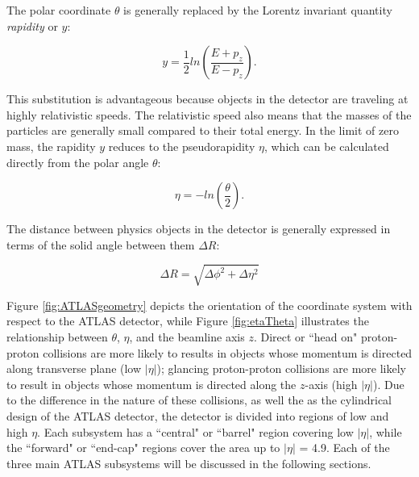 \indent The polar coordinate $\theta$ is generally replaced by the Lorentz invariant quantity \textit{rapidity} or $y$:

\begin{equation}
	y = \frac{1}{2} ln(\frac{E+p_z}{E-p_z}) .
\end{equation}

This substitution is advantageous because objects in the detector are traveling at highly relativistic speeds. The relativistic speed also means that the masses of the particles are generally small compared to their total energy. In the limit of zero mass, the rapidity $y$ reduces to the pseudorapidity $\eta$, which can be calculated directly from the polar angle $\theta$:

\begin{equation}
	\eta = -ln(\frac{\theta}{2}) .
\end{equation}

The distance between physics objects in the detector is generally expressed in terms of the solid angle between them $\Delta R$: 

\begin{equation}
	\Delta R = \sqrt{\Delta\phi^2 + \Delta\eta^2}
\end{equation}

\par

\indent Figure \ref{fig:ATLASgeometry} depicts the orientation of the coordinate system with respect to the ATLAS detector, while Figure \ref{fig:etaTheta} illustrates the relationship between $\theta$, $\eta$, and the beamline axis $z$. Direct or ``head on" proton-proton collisions are more likely to results in objects whose momentum is directed along transverse plane (low $|\eta|$); glancing proton-proton collisions are more likely to result in objects whose momentum is directed along the $z$-axis (high $|\eta|$). Due to the difference in the nature of these collisions, as well the as the cylindrical design of the ATLAS detector, the detector is divided into regions of low and high $\eta$. Each subsystem has a ``central" or ``barrel" region covering low $|\eta|$, while the ``forward" or ``end-cap" regions cover the area up to $|\eta|$ = 4.9. Each of the three main ATLAS subsystems will be discussed in the following sections.

